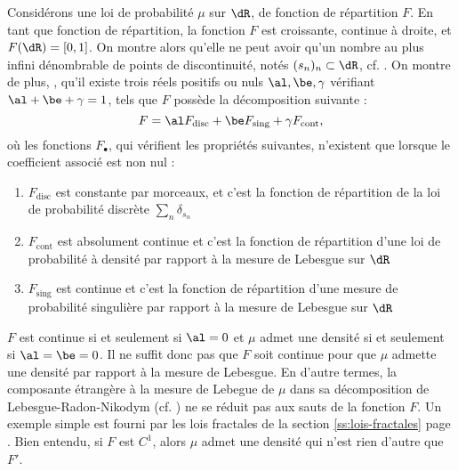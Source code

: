 \begin{rem}
  Considérons une loi de probabilité $\mu$ sur $\dR$, de fonction de
  répartition $F$. En tant que fonction de répartition, la fonction $F$ est
  croissante, continue à droite, et $F(\dR)=[0,1]$. On montre alors qu'elle ne
  peut avoir qu'un nombre au plus infini dénombrable de points de discontinuité, notés
  $(s_n)_n\subset\dR$, cf.  \cite[prop. III.2.2 page
  48]{barbe-ledoux}. On montre de plus, \cite[III, pages 49-50]{barbe-ledoux},
  qu'il existe trois réels positifs ou nuls $\al, \be, \gamma$ vérifiant
  $\al+\be+\gamma=1$, tels que $F$ possède la décomposition suivante :
  $$
  F=\al F_{\text{disc}} + \be F_{\text{sing}} + \gamma F_{\text{cont}},
  $$
  où les fonctions $F_\bullet$, qui vérifient les propriétés suivantes,
  n'existent que lorsque le coefficient associé est non nul :
  \begin{enumerate}
  \item $F_{\text{disc}}$ est constante par morceaux, et c'est la fonction de
    répartition de la loi de probabilité discrète
    $\sum_n\delta_{s_n}$
  \item $F_{\text{cont}}$ est absolument continue et c'est la fonction de
    répartition d'une loi de probabilité à densité par rapport à la mesure de
    Lebesgue sur $\dR$
  \item $F_{\text{sing}}$ est continue et c'est la fonction de répartition
    d'une mesure de probabilité singulière par rapport à la mesure de Lebesgue
    sur $\dR$
  \end{enumerate}
  $F$ est continue si et seulement si $\al=0$ et $\mu$ admet une densité si et
  seulement si $\al=\be=0$.  Il ne suffit donc pas que $F$ soit continue pour
  que $\mu$ admette une densité par rapport à la mesure de Lebesgue. En
  d'autre termes, la composante étrangère à la mesure de Lebegue de $\mu$ dans
  sa décomposition de Lebesgue-Radon-Nikodym (cf. \cite[thm 6.9, page
  117]{rudin}) ne se réduit pas aux sauts de la fonction $F$. Un exemple
  simple est fourni par les lois fractales de la section
  \ref{ss:lois-fractales} page \pageref{ss:lois-fractales}.  Bien entendu, si
  $F$ est $C^1$, alors $\mu$ admet une densité qui n'est rien d'autre que
  $F'$.
\end{rem}

